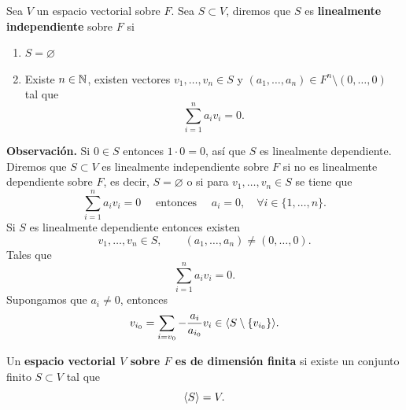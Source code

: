 \documentclass[12pt,a4paper]{book}
\begin{document}
    \begin{definicion}
        Sea $V$ un espacio vectorial sobre $F$. Sea $S\subset V$, diremos que $S$ es \textbf{linealmente
        independiente} sobre $F$ si
        \begin{enumerate}
            \item $S=\varnothing$
            \item Existe $n\in\mathbb{N}$, existen vectores $v_{1},\dots,v_{n}\in S$ y $(a_{1},\dots,a_{n})\in F^{n}\setminus(0,\dots,0)$
            tal que
            \begin{equation*}
                \sum_{i=1}^{n}a_{i}v_{i}=0.
            \end{equation*}
        \end{enumerate}
    \end{definicion}

    \textbf{Observación.} Si $0\in S$ entonces $1\cdot 0=0$, así que $S$ es linealmente dependiente.\\
    Diremos que $S\subset V$ es linealmente independiente sobre $F$ si no es linealmente
    dependiente sobre $F$, es decir, $S=\varnothing$  o si para $v_{1},\dots,v_{n}\in S$ se tiene que
    \begin{equation*}
        \sum_{i=1}^{n}a_{i}v_{i}=0\quad\text{ entonces }\quad a_{i}=0,\quad\forall i\in\{1,\dots,n\}.
    \end{equation*}
    Si $S$ es linealmente dependiente entonces existen
    \begin{equation*}
        v_{1},\dots,v_{n}\in S,\qquad (a_{1},\dots,a_{n})\neq(0,\dots,0).
    \end{equation*}
    Tales que
    \begin{equation*}
        \sum_{i=1}^{n}a_{i}v_{i}=0.
    \end{equation*}
    Supongamos que $a_{i}\neq0$, entonces
    \begin{equation*}
        v_{i_{0}}=\sum_{i=v_{0}}-\frac{a_{i}}{a_{i_{0}}}v_{i}\in\langle S\setminus\{v_{i_{0}}\} \rangle.
    \end{equation*}

    \begin{definicion}
        Un \textbf{espacio vectorial $V$ sobre $F$ es de dimensión finita} si existe un conjunto finito
        $S\subset V$ tal que
        \begin{equation*}
            \langle S \rangle=V.
        \end{equation*}
    \end{definicion}
\end{document}
